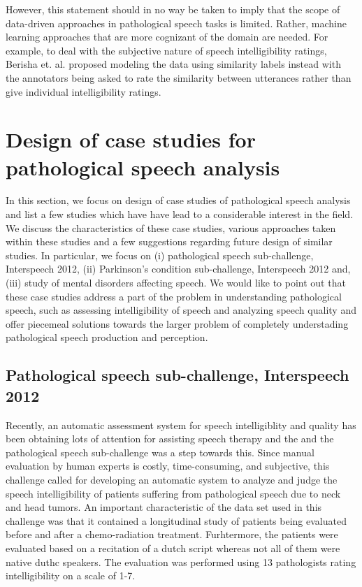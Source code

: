 \documentclass{article}
\begin{document}
However, this statement should in no way be taken to imply that the scope of data-driven approaches in pathological speech tasks is limited. Rather, machine learning approaches that are more cognizant of the domain are needed. For example, to deal with the subjective nature of speech intelligibility ratings, Berisha et. al. \cite{berisha2014modeling} proposed modeling the data using similarity labels instead with the annotators being asked to rate the similarity between utterances rather than give individual intelligibility ratings.


\section{Design of case studies for pathological speech analysis}
In this section, we focus on design of case studies of pathological speech analysis and list a few studies which have have lead to a considerable interest in the field. 
We discuss the characteristics of these case studies, various approaches taken within these studies and a few suggestions regarding future design of similar studies. 
In particular, we focus on (i) pathological speech sub-challenge, Interspeech 2012, (ii) Parkinson's condition sub-challenge, Interspeech 2012 and, (iii) study of mental disorders affecting speech. 
We would like to point out that these case studies address a part of the problem in understanding pathological speech, such as assessing intelligibility of speech and analyzing speech quality and offer piecemeal solutions towards the larger problem of completely understading pathological speech production and perception.

\subsection{Pathological speech sub-challenge, Interspeech 2012}
Recently, an automatic assessment system for speech intelligiblity and quality has been obtaining lots of attention for assisting speech therapy and the and the pathological speech sub-challenge was a step towards this.
Since manual evaluation by human experts is costly, time-consuming, and subjective, this challenge called for developing an automatic system to analyze and judge the speech intelligibility of patients suffering from pathological speech due to neck and head tumors.
An important characteristic of the data set used in this challenge was that it contained a longitudinal study of patients being evaluated before and after a chemo-radiation treatment.
Furhtermore, the patients were evaluated based on a recitation of a dutch script whereas not all of them were native duthc speakers. 
The evaluation was performed using 13 pathologists rating intelligibility on a scale of 1-7.
\end{document}
